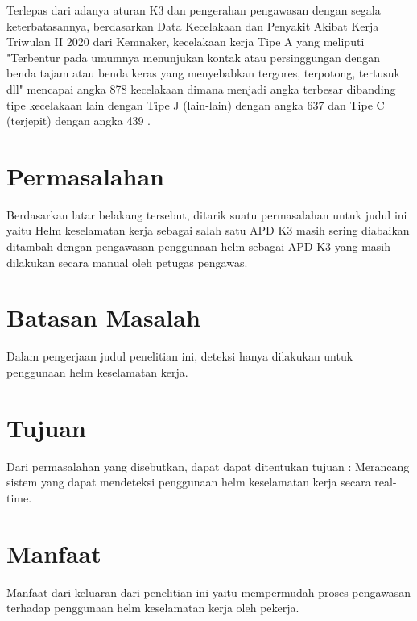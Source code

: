 Terlepas dari adanya aturan K3 dan pengerahan pengawasan dengan segala keterbatasannya, berdasarkan Data Kecelakaan dan Penyakit Akibat Kerja Triwulan II 2020 dari Kemnaker, kecelakaan kerja Tipe A yang meliputi "Terbentur pada umumnya menunjukan kontak atau persinggungan dengan benda tajam atau benda keras yang menyebabkan tergores, terpotong, tertusuk dll" mencapai angka 878 kecelakaan dimana menjadi angka terbesar dibanding tipe kecelakaan lain dengan Tipe J (lain-lain) dengan angka 637 dan Tipe C (terjepit) dengan angka 439 \cite{satudata_kecelakaan_kerja}.


\section{Permasalahan}
\label{sec:permasalahan}

Berdasarkan latar belakang tersebut, ditarik suatu permasalahan untuk judul ini yaitu Helm keselamatan kerja sebagai salah satu APD K3 masih sering diabaikan ditambah dengan pengawasan penggunaan helm sebagai APD K3 yang masih dilakukan secara manual oleh petugas pengawas.


\section{Batasan Masalah}
\label{sec:batasanmasalah}

Dalam pengerjaan judul penelitian ini, deteksi hanya dilakukan untuk penggunaan helm keselamatan kerja.

\section{Tujuan}
\label{sec:Tujuan}

Dari permasalahan yang disebutkan, dapat dapat ditentukan tujuan : Merancang sistem yang dapat mendeteksi penggunaan helm keselamatan kerja secara real-time.

\section{Manfaat}
\label{sec:manfaat}

Manfaat dari keluaran dari penelitian ini yaitu mempermudah proses pengawasan terhadap penggunaan helm keselamatan kerja oleh pekerja.



